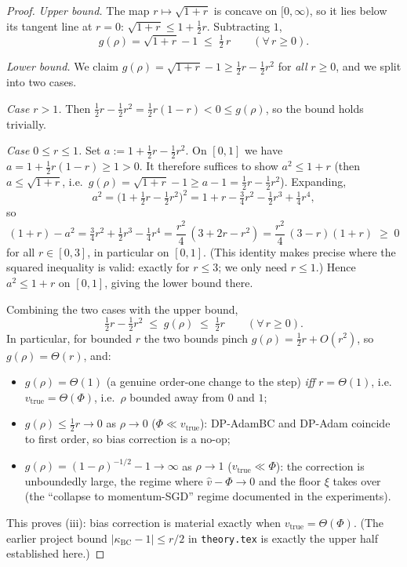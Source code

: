 \begin{proof}
\emph{Upper bound.} The map $r\mapsto\sqrt{1+r}$ is concave on $[0,\infty)$, so it lies below its tangent line at $r=0$: $\sqrt{1+r}\le 1+\tfrac12 r$. Subtracting $1$,
\[
g(\rho)=\sqrt{1+r}-1\;\le\;\tfrac12\,r\qquad(\forall\,r\ge0).
\]

\emph{Lower bound.} We claim $g(\rho)=\sqrt{1+r}-1\ge \tfrac12 r-\tfrac12 r^2$ for \emph{all} $r\ge 0$, and we split into two cases.

\noindent\textit{Case $r>1$.} Then $\tfrac12 r-\tfrac12 r^2=\tfrac12 r(1-r)<0\le g(\rho)$, so the bound holds trivially.

\noindent\textit{Case $0\le r\le 1$.} Set $a:=1+\tfrac12 r-\tfrac12 r^2$. On $[0,1]$ we have $a=1+\tfrac12 r(1-r)\ge 1>0$. It therefore suffices to show $a^2\le 1+r$ (then $a\le\sqrt{1+r}$, i.e.\ $g(\rho)=\sqrt{1+r}-1\ge a-1=\tfrac12 r-\tfrac12 r^2$). Expanding,
\[
a^2=\Big(1+\tfrac12 r-\tfrac12 r^2\Big)^2=1+r-\tfrac34 r^2-\tfrac12 r^3+\tfrac14 r^4,
\]
so
\[
(1+r)-a^2=\tfrac34 r^2+\tfrac12 r^3-\tfrac14 r^4=\frac{r^2}{4}\,(3+2r-r^2)=\frac{r^2}{4}\,(3-r)(1+r)\;\ge\;0
\]
for all $r\in[0,3]$, in particular on $[0,1]$. (This identity makes precise where the squared inequality is valid: exactly for $r\le 3$; we only need $r\le1$.) Hence $a^2\le 1+r$ on $[0,1]$, giving the lower bound there.

Combining the two cases with the upper bound,
\[
\tfrac12 r-\tfrac12 r^2\;\le\;g(\rho)\;\le\;\tfrac12 r\qquad(\forall\,r\ge0).
\]
In particular, for bounded $r$ the two bounds pinch $g(\rho)=\tfrac12 r+O(r^2)$, so $g(\rho)=\Theta(r)$, and:
\begin{itemize}
\item $g(\rho)=\Theta(1)$ (a genuine order-one change to the step) \emph{iff} $r=\Theta(1)$, i.e.\ $v_{\mathrm{true}}=\Theta(\Phi)$, i.e.\ $\rho$ bounded away from $0$ and $1$;
\item $g(\rho)\le \tfrac12 r\to 0$ as $\rho\to 0$ ($\Phi\ll v_{\mathrm{true}}$): DP-AdamBC and DP-Adam coincide to first order, so bias correction is a no-op;
\item $g(\rho)=(1-\rho)^{-1/2}-1\to\infty$ as $\rho\to 1$ ($v_{\mathrm{true}}\ll\Phi$): the correction is unboundedly large, the regime where $\hat v-\Phi\to 0$ and the floor $\xi$ takes over (the ``collapse to momentum-SGD'' regime documented in the experiments).
\end{itemize}
This proves (iii): bias correction is material exactly when $v_{\mathrm{true}}=\Theta(\Phi)$. (The earlier project bound $|\kappa_{\mathrm{BC}}-1|\le r/2$ in \texttt{theory.tex} is exactly the upper half established here.)


\end{proof}
